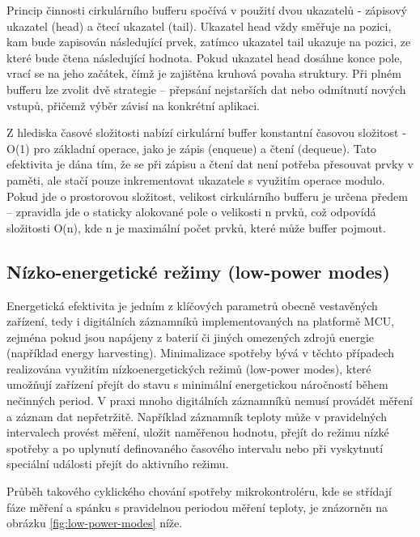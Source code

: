 Princip činnosti cirkulárního bufferu spočívá v použití dvou ukazatelů - zápisový ukazatel (head) a čtecí ukazatel (tail). Ukazatel 
head vždy směřuje na pozici, kam bude zapisován následující prvek, zatímco ukazatel tail ukazuje na pozici, ze které bude čtena 
následující hodnota. Pokud ukazatel head dosáhne konce pole, vrací se na jeho začátek, čímž je zajištěna kruhová povaha struktury. 
Při plném bufferu lze zvolit dvě strategie – přepsání nejstarších dat nebo odmítnutí nových vstupů, přičemž výběr závisí na konkrétní aplikaci. \cite{embedjournal_ring_buffer, medium_ring_buffer}

Z hlediska časové složitosti nabízí cirkulární buffer konstantní časovou složitost - O(1) pro základní operace, jako je zápis 
(enqueue) a  čtení (dequeue). Tato efektivita je dána tím, že se při zápisu a čtení dat není potřeba přesouvat prvky v paměti, 
ale stačí pouze inkrementovat ukazatele s využitím operace modulo. Pokud jde o prostorovou složitost, velikost cirkulárního bufferu 
je určena předem – zpravidla jde o staticky alokované pole o velikosti n prvků, což odpovídá složitosti O(n), kde n je maximální 
počet prvků, které může buffer pojmout. \cite{petrungaro_ring_buffer_complexity}

\subsection{Nízko-energetické režimy (low-power modes)}
Energetická efektivita je jedním z klíčových parametrů obecně vestavěných zařízení, tedy i digitálních záznamníků implementovaných 
na platformě MCU, zejména pokud jsou napájeny z baterií či jiných omezených zdrojů energie (například energy harvesting). 
Minimalizace spotřeby bývá v těchto případech realizována využitím nízkoenergetických režimů (low-power modes), které umožňují 
zařízení přejít do stavu s minimální energetickou náročností během nečinných period. V praxi mnoho digitálních záznamníků nemusí 
provádět měření a záznam dat nepřetržitě. Například záznamník teploty může v pravidelných intervalech provést měření, uložit 
naměřenou hodnotu, přejít do režimu nízké spotřeby a po uplynutí definovaného časového intervalu nebo při vyskytnutí speciální 
události přejít do aktivního režimu. \cite{analog_devices_low_power_modes}

Průběh takového cyklického chování spotřeby mikrokontroléru, kde se střídají fáze měření a spánku s pravidelnou periodou měření 
teploty, je znázorněn na obrázku \ref{fig:low-power-modes} níže.

